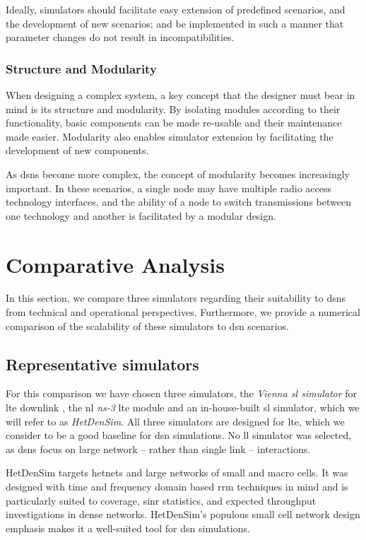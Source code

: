 \documentclass[conference]{IEEEtran}
\begin{document}
Ideally, simulators should facilitate easy extension of predefined scenarios, and the development of new scenarios; and be implemented in such a manner that parameter changes do not result in incompatibilities.

\subsubsection{Structure and Modularity}

When designing a complex system, a key concept that the designer must bear in mind is its structure and modularity. By isolating modules according to their functionality, basic components can be made re-usable and their maintenance made easier. Modularity also enables simulator extension by facilitating the development of new components.

As \acp{dsn} become more complex, the concept of modularity becomes increasingly important. In these scenarios, a single node may have multiple radio access technology interfaces, and the ability of a node to switch transmissions between one technology and another is facilitated by a modular design.



\section{Comparative Analysis}


In this section, we compare three simulators regarding their suitability to \aclp{dsn} from technical and operational perspectives. Furthermore, we provide a numerical comparison of the scalability of these simulators to \ac{dsn} scenarios.

\subsection{Representative simulators}\label{subsect:Ownership}

For this comparison we have chosen three simulators, the \textit{Vienna \ac{sl} simulator} for \ac{lte} downlink \cite{Ikuno2010}, the \ac{nl} \textit{ns-3} \ac{lte} module \cite{Piro2011} and an in-house-built \ac{sl} simulator, which we will refer to as \textit{HetDenSim}. All three simulators are designed for \ac{lte}, which we consider to be a good baseline for \ac{dsn} simulations. No \ac{ll} simulator was selected, as \acp{dsn} focus on large network -- rather than single link -- interactions.

HetDenSim targets \ac{hetnets} and large networks of small and macro cells. It was designed with time and frequency domain based \ac{rrm} techniques in mind and is particularly suited to coverage, \ac{sinr} statistics, and expected throughput investigations in dense networks.
HetDenSim's populous small cell network design emphasis makes it a well-suited tool for \ac{dsn} simulations.
\end{document}
